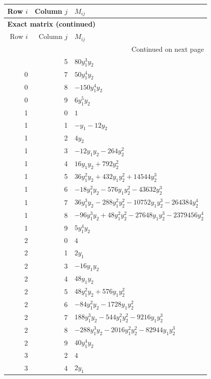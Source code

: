 \documentclass[10pt,a4paper]{article}
\begin{document}
{\small\setlength{\tabcolsep}{7pt}\begin{longtable}{rrp{125mm}}
\toprule Row $i$ & Column $j$ & $M_{ij}$\\\midrule\endfirsthead
\multicolumn{3}{l}{\textbf{Exact matrix (continued)}}\\
\toprule Row $i$ & Column $j$ & $M_{ij}$\\\midrule\endhead
\midrule\multicolumn{3}{r}{Continued on next page}\\\endfoot\bottomrule\endlastfoot
0 & 5 & $80 y_{1}^{3} y_{2}$\\
0 & 7 & $50 y_{1}^{4} y_{2}$\\
0 & 8 & $- 150 y_{1}^{4} y_{2}$\\
0 & 9 & $6 y_{1}^{5} y_{2}$\\
1 & 0 & $1$\\
1 & 1 & $- y_{1} - 12 y_{2}$\\
1 & 2 & $4 y_{2}$\\
1 & 3 & $- 12 y_{1} y_{2} - 264 y_{2}^{2}$\\
1 & 4 & $16 y_{1} y_{2} + 792 y_{2}^{2}$\\
1 & 5 & $36 y_{1}^{2} y_{2} + 432 y_{1} y_{2}^{2} + 14544 y_{2}^{3}$\\
1 & 6 & $- 18 y_{1}^{2} y_{2} - 576 y_{1} y_{2}^{2} - 43632 y_{2}^{3}$\\
1 & 7 & $36 y_{1}^{3} y_{2} - 288 y_{1}^{2} y_{2}^{2} - 10752 y_{1} y_{2}^{3} - 264384 y_{2}^{4}$\\
1 & 8 & $- 96 y_{1}^{3} y_{2} + 48 y_{1}^{2} y_{2}^{2} - 27648 y_{1} y_{2}^{3} - 2379456 y_{2}^{4}$\\
1 & 9 & $5 y_{1}^{4} y_{2}$\\
2 & 0 & $4$\\
2 & 1 & $2 y_{1}$\\
2 & 3 & $- 16 y_{1} y_{2}$\\
2 & 4 & $48 y_{1} y_{2}$\\
2 & 5 & $48 y_{1}^{2} y_{2} + 576 y_{1} y_{2}^{2}$\\
2 & 6 & $- 84 y_{1}^{2} y_{2} - 1728 y_{1} y_{2}^{2}$\\
2 & 7 & $188 y_{1}^{3} y_{2} - 544 y_{1}^{2} y_{2}^{2} - 9216 y_{1} y_{2}^{3}$\\
2 & 8 & $- 288 y_{1}^{3} y_{2} - 2016 y_{1}^{2} y_{2}^{2} - 82944 y_{1} y_{2}^{3}$\\
2 & 9 & $40 y_{1}^{4} y_{2}$\\
3 & 2 & $4$\\
3 & 4 & $2 y_{1}$\\

\end{longtable}}
\end{document}
